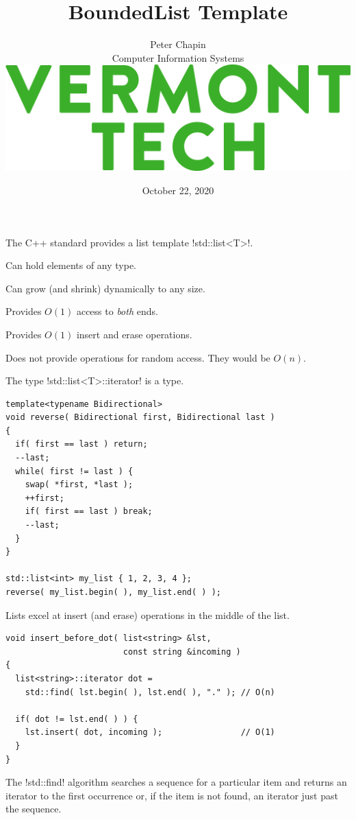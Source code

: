 \documentclass[landscape]{slides}
\title{\color{titlecolor}BoundedList Template}
\author{
  \begin{tabular}{c}
  \\[3mm]
  \Large{Peter Chapin} \\[2mm]
  \normalsize{Computer Information Systems}\\[5mm]
  \includegraphics[scale=0.80]{VermontTech_stack_361.jpg}\\[16mm]
  \end{tabular}
}
\date{October 22, 2020}
\begin{document}
\color{Black}
\pagecolor{Background}

\maketitle


The C++ standard provides a list template !std::list<T>!.
\begin{citemize}
\item Can hold elements of any type.
\item Can grow (and shrink) dynamically to any size.
\item Provides $O(1)$ access to \emph{both} ends.
\item Provides $O(1)$ insert and erase operations.
\end{citemize}
Does not provide operations for random access. They would be $O(n)$.
\stopslide


The type !std::list<T>::iterator! is a  type.
\vspace{5mm}
{\small
\begin{lstlisting}
template<typename Bidirectional>
void reverse( Bidirectional first, Bidirectional last )
{
  if( first == last ) return;
  --last;
  while( first != last ) {
    swap( *first, *last );
    ++first;
    if( first == last ) break;
    --last;
  }
}

std::list<int> my_list { 1, 2, 3, 4 };
reverse( my_list.begin( ), my_list.end( ) );
\end{lstlisting}
}
\stopslide


Lists excel at insert (and erase) operations in the middle of the list.
\vspace{5mm}
{\small
\begin{lstlisting}
void insert_before_dot( list<string> &lst,
                        const string &incoming )
{
  list<string>::iterator dot =
    std::find( lst.begin( ), lst.end( ), "." ); // O(n)

  if( dot != lst.end( ) ) {
    lst.insert( dot, incoming );                // O(1)
  }
}
\end{lstlisting}
}
The !std::find! algorithm searches a sequence for a particular item and returns an iterator to
the first occurrence or, if the item is not found, an iterator just past the sequence.
\end{document}

